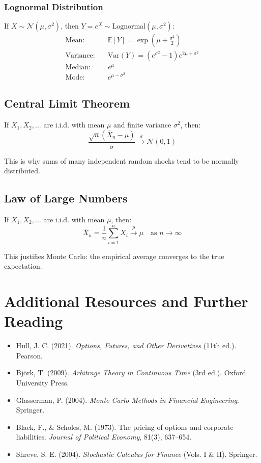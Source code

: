 \documentclass[12pt,a4paper]{article}
\begin{document}
\subsubsection{Lognormal Distribution}

If $X \sim \mathcal{N}(\mu, \sigma^2)$, then $Y = e^X \sim \text{Lognormal}(\mu, \sigma^2)$:
\begin{align}
\text{Mean}: & \quad \mathbb{E}[Y] = \exp\left(\mu + \frac{\sigma^2}{2}\right) \\
\text{Variance}: & \quad \text{Var}(Y) = \left(e^{\sigma^2} - 1\right) e^{2\mu + \sigma^2} \\
\text{Median}: & \quad e^{\mu} \\
\text{Mode}: & \quad e^{\mu - \sigma^2}
\end{align}

\subsection{Central Limit Theorem}

If $X_1, X_2, \ldots$ are i.i.d. with mean $\mu$ and finite variance $\sigma^2$, then:
\begin{equation}
\frac{\sqrt{n}(\bar{X}_n - \mu)}{\sigma} \xrightarrow{d} \mathcal{N}(0, 1)
\end{equation}

This is why sums of many independent random shocks tend to be normally distributed.

\subsection{Law of Large Numbers}

If $X_1, X_2, \ldots$ are i.i.d. with mean $\mu$, then:
\begin{equation}
\bar{X}_n = \frac{1}{n}\sum_{i=1}^n X_i \xrightarrow{p} \mu \quad \text{as } n \to \infty
\end{equation}

This justifies Monte Carlo: the empirical average converges to the true expectation.

\section{Additional Resources and Further Reading}

\begin{itemize}
    \item Hull, J. C. (2021). \textit{Options, Futures, and Other Derivatives} (11th ed.). Pearson.
    \item Björk, T. (2009). \textit{Arbitrage Theory in Continuous Time} (3rd ed.). Oxford University Press.
    \item Glasserman, P. (2004). \textit{Monte Carlo Methods in Financial Engineering}. Springer.
    \item Black, F., \& Scholes, M. (1973). The pricing of options and corporate liabilities. \textit{Journal of Political Economy}, 81(3), 637–654.
    \item Shreve, S. E. (2004). \textit{Stochastic Calculus for Finance} (Vols. I \& II). Springer.
\end{itemize}
\end{document}
